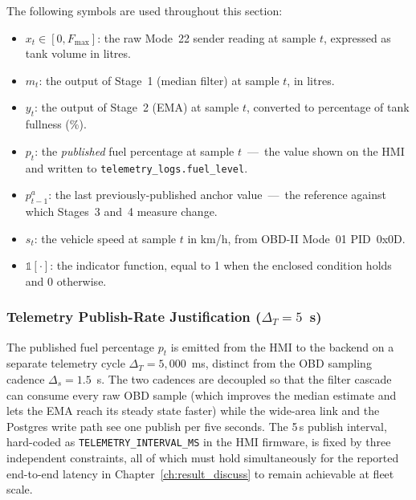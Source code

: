 The following symbols are used throughout this section:
\begin{itemize}
    \item $x_t \in [0, F_{\max}]$: the raw Mode~22 sender reading at sample $t$, expressed as tank volume in litres.
    \item $m_t$: the output of Stage~1 (median filter) at sample $t$, in litres.
    \item $y_t$: the output of Stage~2 (EMA) at sample $t$, converted to percentage of tank fullness (\%).
    \item $p_t$: the \emph{published} fuel percentage at sample $t$~---~the value shown on the HMI and written to \texttt{telemetry\_logs.fuel\_level}.
    \item $p^{a}_{t-1}$: the last previously-published anchor value~---~the reference against which Stages~3 and~4 measure change.
    \item $s_t$: the vehicle speed at sample $t$ in km/h, from OBD-II Mode~01 PID~0x0D.
    \item $\mathbb{1}[\cdot]$: the indicator function, equal to 1 when the enclosed condition holds and 0 otherwise.
\end{itemize}

\subsubsection{Telemetry Publish-Rate Justification ($\Delta_T = 5$~s)}
\label{sec:telemetry_publish_rate}

The published fuel percentage $p_t$ is emitted from the HMI to the backend on a separate telemetry cycle $\Delta_T = 5{,}000$~ms, distinct from the OBD sampling cadence $\Delta_s = 1.5$~s. The two cadences are decoupled so that the filter cascade can consume every raw OBD sample (which improves the median estimate and lets the EMA reach its steady state faster) while the wide-area link and the Postgres write path see one publish per five seconds. The 5\,s publish interval, hard-coded as \texttt{TELEMETRY\_INTERVAL\_MS} in the HMI firmware, is fixed by three independent constraints, all of which must hold simultaneously for the reported end-to-end latency in Chapter~\ref{ch:result_discuss} to remain achievable at fleet scale.

